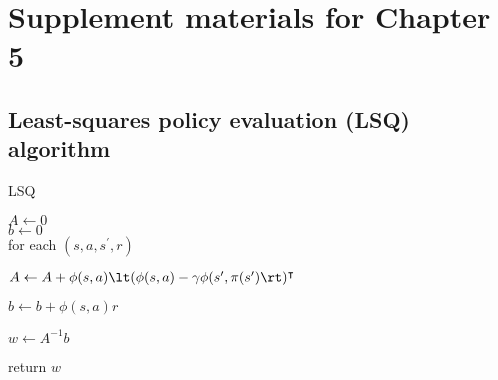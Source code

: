 \chapter{Supplement materials for Chapter 5}
\section{Least-squares policy evaluation (LSQ) algorithm}
\begin{algorithm}[H]
	\caption{LSQ}
	$A \leftarrow 0$ \\
	$b \leftarrow 0$ \\
	for each $(s,a, s^{\prime}, r)$
	
	\hspace{25pt} $A \leftarrow A + \phi(s,a)\lt(\phi(s,a) - \gamma \phi(s',\pi(s')\rt)^\intercal $
	
	\hspace{25pt} $b \leftarrow  b + \phi(s,a)r$
	
	$w	\leftarrow A^{-1}b$
	
	return $w$
\end{algorithm}
